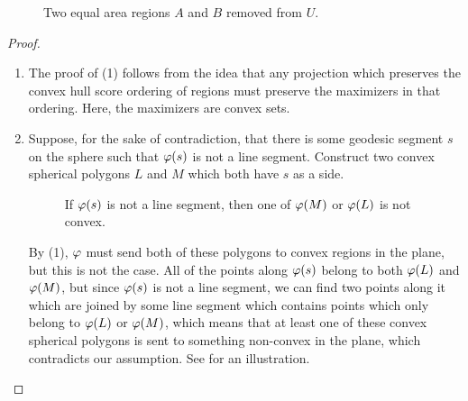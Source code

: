 \ifsmallfigs
\else
\begin{figure}[h]
	\centering
	
	\caption{Two equal area regions $A$ and $B$ removed from $U$.}
	\label{fig:ch_schema}
\end{figure}
\fi


\begin{proof}
	\ \\
	
	\vspace*{-2em}
	\begin{enumerate}
		\item[] The proof of (1) follows from the idea that any projection which preserves the convex hull score ordering of regions must 
		preserve the maximizers in that ordering.   Here, the maximizers are convex sets.
		
		\item[]  Suppose, for the sake of contradiction, that there is some geodesic segment $s$ on the sphere such that $\varphi(s)$ is not a line segment. Construct two convex spherical polygons $L$ and $M$ which both have $s$ as a side. 




\ifsmallfigs
\begin{figure}
	\centering
	\begin{minipage}{.5\textwidth}
		\centering
	\resizebox{.95\textwidth}{!}{}	
	\label{fig:ch_schema}
	\end{minipage}%
	\begin{minipage}{.5\textwidth}
		\centering
		\resizebox{1.15\textwidth}{!}{}
\label{fig:lineconvexcont}
	\end{minipage}
\end{figure}
\fi





		
\ifsmallfigs
\else		
\begin{figure}[h]
	\centering
	
	\caption{If $\varphi(s)$ is not a line segment, then one of $\varphi(M)$ or $\varphi(L)$ is not convex.}
	\label{fig:lineconvexcont}
\end{figure}
\fi
		 By (1), $\varphi$ must send both of these polygons to convex regions in the plane, but this is not the case.  All of the points along $\varphi(s)$ belong to both $\varphi(L)$ and $\varphi(M)$, but since $\varphi(s)$ is not a line segment, we can find two points along it which are joined by some line segment which contains points which only belong to $\varphi(L)$ or $\varphi(M)$, which means that at least one of these convex spherical polygons is sent to something non-convex in the plane, which contradicts our assumption.		See  for an illustration.
		

\end{enumerate}
\end{proof}
